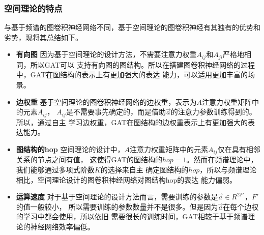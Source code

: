 \subsubsection{空间理论的特点}
与基于频谱的图卷积神经网络不同，基于空间理论的图卷积神经有其独有的优势和劣势，现将其总结如下。
\begin{itemize}
    \item \textbf{有向图} \quad
    因为基于空间理论的设计方法，不需要注意力权重$A_{ij}$和$A_{ji}$严格地相同，所以GAT可以
    支持有向图的图结构。所以在搭建图卷积神经网络的过程中，GAT在图结构的表示上有更加强大的表达
    能力，可以适用更加丰富的场景。
    
    \item \textbf{边权重} \quad
    基于空间理论的图卷积神经网络的边权重，表示为$ A $注意力权重矩阵中的元素$A_{ij}$，
    $A_{ij}$是不需要事先确定的，而是借助$ \vec{a} $的注意力参数训练得到的。所以，通过自主
    学习边权重，GAT在图结构的边权重表示上有更加强大的表达能力。

    \item \textbf{图结构的hop} \quad
    空间理论的设计中，$ A $注意力权重矩阵中的元素$A_{ij}$仅在具有相邻关系的节点之间有值，
    这使得GAT的图结构的$ hop=1 $。然而在频谱理论中，我们能够通过多项式阶数$ K $的选择来自主
    确定图结构的$ hop $，所以与频谱理论相比，空间理论设计的图卷积神经网络对图结构hop的表达
    能力偏弱。

    \item \textbf{运算速度} \quad
    对于基于空间理论的设计方法而言，需要训练的参数是$ \vec{a} \in R^{2F'} $，$F'$的值一般较小，
    所以需要训练的参数数量并不是很多。但是因为$ \vec{a} $在每个边权的学习中都会使用，所以依旧
    需要很长的训练时间，GAT相较于基于频谱理论的神经网络效率偏低。

\end{itemize}